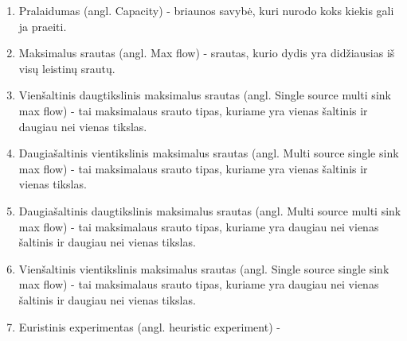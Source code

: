 \begin{enumerate}
	\item Pralaidumas (angl. Capacity) - briaunos savybė, kuri nurodo koks kiekis gali ja praeiti.
	\item  Maksimalus srautas (angl. Max flow) - srautas, kurio dydis yra didžiausias iš visų leistinų srautų.
	\item Vienšaltinis daugtikslinis maksimalus srautas (angl. Single source multi sink max flow) - tai maksimalaus srauto tipas, kuriame yra vienas šaltinis ir daugiau nei vienas tikslas.
	\item Daugiašaltinis vientikslinis maksimalus srautas (angl. Multi source single sink max flow) - tai maksimalaus srauto tipas, kuriame yra vienas šaltinis ir vienas tikslas.
	\item Daugiašaltinis daugtikslinis maksimalus srautas (angl. Multi source multi sink max flow) - tai maksimalaus srauto tipas, kuriame yra daugiau nei vienas šaltinis ir daugiau nei vienas tikslas.
	\item Vienšaltinis vientikslinis maksimalus srautas (angl. Single source single sink max flow) - tai maksimalaus srauto tipas, kuriame yra daugiau nei vienas šaltinis ir daugiau nei vienas tikslas.
	\item Euristinis experimentas (angl. heuristic experiment) -
\end{enumerate}